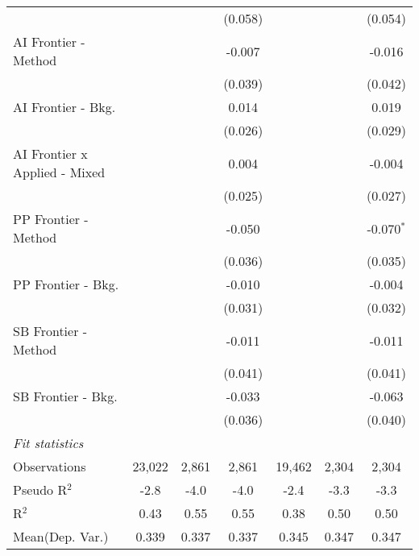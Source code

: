 \begin{tabular}{lcccccc}
                                 &               &         & (0.058) &               &         & (0.054)\\   
   AI Frontier - Method          &               &         & -0.007  &               &         & -0.016\\   
                                 &               &         & (0.039) &               &         & (0.042)\\   
   AI Frontier - Bkg.            &               &         & 0.014   &               &         & 0.019\\   
                                 &               &         & (0.026) &               &         & (0.029)\\   
   AI Frontier x Applied - Mixed &               &         & 0.004   &               &         & -0.004\\   
                                 &               &         & (0.025) &               &         & (0.027)\\   
   PP Frontier - Method          &               &         & -0.050  &               &         & -0.070$^{*}$\\   
                                 &               &         & (0.036) &               &         & (0.035)\\   
   PP Frontier - Bkg.            &               &         & -0.010  &               &         & -0.004\\   
                                 &               &         & (0.031) &               &         & (0.032)\\   
   SB Frontier - Method          &               &         & -0.011  &               &         & -0.011\\   
                                 &               &         & (0.041) &               &         & (0.041)\\   
   SB Frontier - Bkg.            &               &         & -0.033  &               &         & -0.063\\   
                                 &               &         & (0.036) &               &         & (0.040)\\   
   \midrule
   \emph{Fit statistics}\\
   Observations                  & 23,022        & 2,861   & 2,861   & 19,462        & 2,304   & 2,304\\  
   Pseudo R$^2$                  & -2.8          & -4.0    & -4.0    & -2.4          & -3.3    & -3.3\\  
   R$^2$                         & 0.43          & 0.55    & 0.55    & 0.38          & 0.50    & 0.50\\  
Mean(Dep. Var.) & 0.339 & 0.337 & 0.337 & 0.345 & 0.347 & 0.347 \\
   

\end{tabular}

